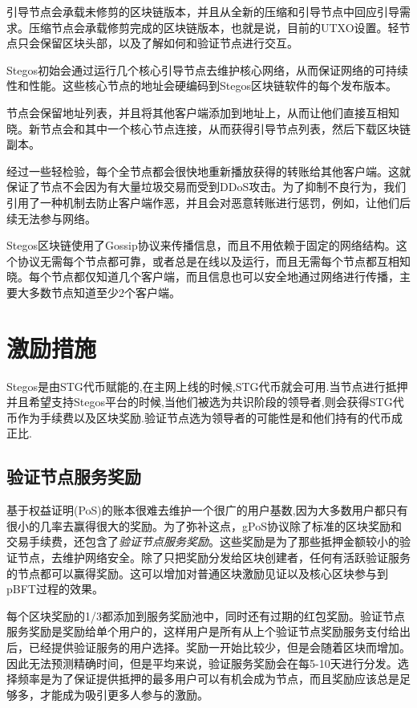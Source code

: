 \documentclass[8pt,fleqn,openany]{book}
\begin{document}
\begin{CJK*}{UTF8}{gbsn}
引导节点会承载未修剪的区块链版本，并且从全新的压缩和引导节点中回应引导需求。压缩节点会承载修剪完成的区块链版本，也就是说，目前的UTXO设置。轻节点只会保留区块头部，以及了解如何和验证节点进行交互。

Stegos初始会通过运行几个核心引导节点去维护核心网络，从而保证网络的可持续性和性能。这些核心节点的地址会硬编码到Stegos区块链软件的每个发布版本。

节点会保留地址列表，并且将其他客户端添加到地址上，从而让他们直接互相知晓。新节点会和其中一个核心节点连接，从而获得引导节点列表，然后下载区块链副本。

经过一些轻检验，每个全节点都会很快地重新播放获得的转账给其他客户端。这就保证了节点不会因为有大量垃圾交易而受到DDoS攻击。为了抑制不良行为，我们引用了一种机制去防止客户端作恶，并且会对恶意转账进行惩罚，例如，让他们后续无法参与网络。

Stegos区块链使用了Gossip协议来传播信息，而且不用依赖于固定的网络结构。这个协议无需每个节点都可靠，或者总是在线以及运行，而且无需每个节点都互相知晓。每个节点都仅知道几个客户端，而且信息也可以安全地通过网络进行传播，主要大多数节点知道至少2个客户端。

\section{激励措施}
Stegos是由STG代币赋能的,在主网上线的时候,STG代币就会可用.当节点进行抵押并且希望支持Stegos平台的时候,当他们被选为共识阶段的领导者,则会获得STG代币作为手续费以及区块奖励.验证节点选为领导者的可能性是和他们持有的代币成正比.

\subsection{验证节点服务奖励}\label{sec:service-award}
基于权益证明(PoS)的账本很难去维护一个很广的用户基数,因为大多数用户都只有很小的几率去赢得很大的奖励。为了弥补这点，gPoS协议除了标准的区块奖励和交易手续费，还包含了\textit{验证节点服务奖励}。这些奖励是为了那些抵押金额较小的验证节点，去维护网络安全。除了只把奖励分发给区块创建者，任何有活跃验证服务的节点都可以赢得奖励。这可以增加对普通区块激励见证以及核心区块参与到pBFT过程的效果。

每个区块奖励的1/3都添加到服务奖励池中，同时还有过期的红包奖励。验证节点服务奖励是奖励给单个用户的，这样用户是所有从上个验证节点奖励服务支付给出后，已经提供验证服务的用户选择。奖励一开始比较少，但是会随着区块而增加。因此无法预测精确时间，但是平均来说，验证服务奖励会在每5-10天进行分发。选择频率是为了保证提供抵押的最多用户可以有机会成为节点，而且奖励应该总是足够多，才能成为吸引更多人参与的激励。


\end{CJK*}
\end{document}
